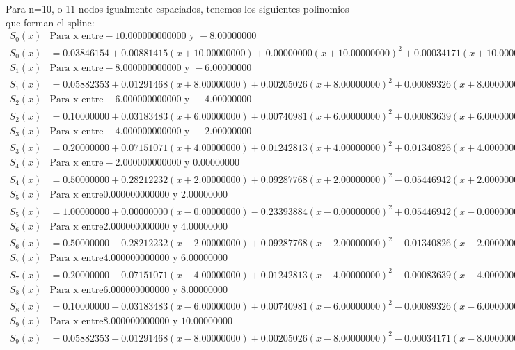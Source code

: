 Para n=10, o 11 nodos igualmente espaciados, tenemos los siguientes polinomios que forman el spline:
\begin{align*}
S_0(x) & \text{Para x entre} -10.000000000000 \text{ y } -8.00000000 \\
S_0(x) & = 0.03846154+0.00881415(x+10.00000000)+0.00000000(x+10.00000000)^2+0.00034171(x+10.00000000)^3 \\
S_1(x) & \text{Para x entre} -8.000000000000 \text{ y } -6.00000000 \\
S_1(x) & = 0.05882353+0.01291468(x+8.00000000)+0.00205026(x+8.00000000)^2+0.00089326(x+8.00000000)^3 \\
S_2(x) & \text{Para x entre} -6.000000000000 \text{ y } -4.00000000 \\
S_2(x) & = 0.10000000+0.03183483(x+6.00000000)+0.00740981(x+6.00000000)^2+0.00083639(x+6.00000000)^3 \\
S_3(x) & \text{Para x entre} -4.000000000000 \text{ y } -2.00000000 \\
S_3(x) & = 0.20000000+0.07151071(x+4.00000000)+0.01242813(x+4.00000000)^2+0.01340826(x+4.00000000)^3 \\
S_4(x) & \text{Para x entre} -2.000000000000 \text{ y } 0.00000000 \\
S_4(x) & = 0.50000000+0.28212232(x+2.00000000)+0.09287768(x+2.00000000)^2-0.05446942(x+2.00000000)^3 \\
S_5(x) & \text{Para x entre} 0.000000000000 \text{ y } 2.00000000 \\
S_5(x) & = 1.00000000+0.00000000(x-0.00000000)-0.23393884(x-0.00000000)^2+0.05446942(x-0.00000000)^3 \\
S_6(x) & \text{Para x entre} 2.000000000000 \text{ y } 4.00000000 \\
S_6(x) & = 0.50000000-0.28212232(x-2.00000000)+0.09287768(x-2.00000000)^2-0.01340826(x-2.00000000)^3 \\
S_7(x) & \text{Para x entre} 4.000000000000 \text{ y } 6.00000000 \\
S_7(x) & = 0.20000000-0.07151071(x-4.00000000)+0.01242813(x-4.00000000)^2-0.00083639(x-4.00000000)^3 \\
S_8(x) & \text{Para x entre} 6.000000000000 \text{ y } 8.00000000 \\
S_8(x) & = 0.10000000-0.03183483(x-6.00000000)+0.00740981(x-6.00000000)^2-0.00089326(x-6.00000000)^3 \\
S_9(x) & \text{Para x entre} 8.000000000000 \text{ y } 10.00000000 \\
S_9(x) & = 0.05882353-0.01291468(x-8.00000000)+0.00205026(x-8.00000000)^2-0.00034171(x-8.00000000)^3
\end{align*}
